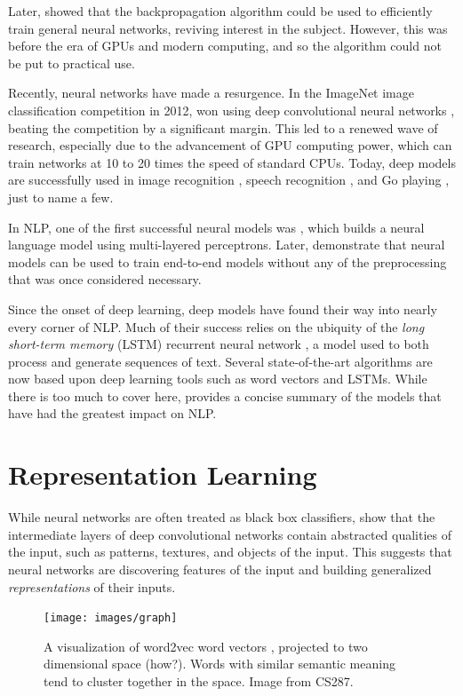 \documentclass[12pt]{report}
\begin{document}
Later, \citet{Rumelhart1986} showed that the backpropagation algorithm could be used to efficiently train general neural networks, reviving interest in the subject. However, this was before the era of GPUs and modern computing, and so the algorithm could not be put to practical use.

Recently, neural networks have made a resurgence. In the ImageNet image classification competition in 2012, \citet{Krizhevsky2012} won using deep convolutional neural networks \citep{LeCun1995}, beating the competition by a significant margin. This led to a renewed wave of research, especially due to the advancement of GPU computing power, which can train networks at 10 to 20 times the speed of standard CPUs. Today, deep models are successfully used in image recognition \citep{Farabet2013}, speech recognition \citep{Hinton2012}, and Go playing \citep{Silver2016}, just to name a few.


In NLP, one of the first successful neural models was \citet{Bengio2003}, which builds a neural language model using multi-layered perceptrons. Later, \citet{Collobert2011} demonstrate that neural models can be used to train end-to-end models without any of the preprocessing that was once considered necessary.

Since the onset of deep learning, deep models have found their way into nearly every corner of NLP. Much of their success relies on the ubiquity of the \emph{long short-term memory} (LSTM) recurrent neural network \citep{hochreiter1997long}, a model used to both process and generate sequences of text.
Several state-of-the-art algorithms are now based upon deep learning tools such as word vectors and LSTMs. While there is too much to cover here, \citet{goldberg2015primer} provides a concise summary of the models that have had the greatest impact on NLP. %

\section{Representation Learning}

While neural networks are often treated as black box classifiers, \citet{Zeiler2014} show that the intermediate layers of deep convolutional networks contain abstracted qualities of the input, such as patterns, textures, and objects of the input. This suggests that neural networks are discovering features of the input and building generalized \emph{representations} of their inputs.

\begin{figure}
\centering
\texttt{[image: images/graph]}
\caption{A visualization of word2vec word vectors \citep{mikolov2013word2vec}, projected to two dimensional space (how?). Words with similar semantic meaning tend to cluster together in the space. Image from CS287.}
\label{fig:word2vec}
\end{figure}
\end{document}
